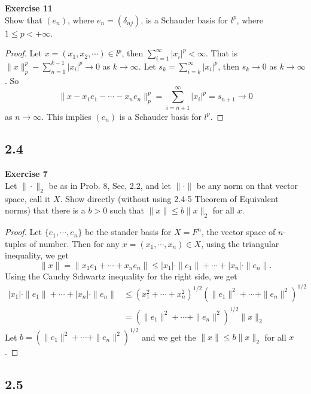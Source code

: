 \documentclass[12pt, a4paper]{article}
\theoremstyle{plain}
\newenvironment{exercise}[2][Exercise]
    { \begin{mdframed}[backgroundcolor=gray!20] \textbf{#1 #2} \\}
    {  \end{mdframed}}
\begin{document}
\begin{exercise}{11}
Show that $(e_n)$, where $e_n=(\delta_{nj})$, is a Schauder basis for $l^p$, where $1\leq p<+\infty$.
\end{exercise}
	\begin{proof}
	Let $x=(x_1,x_2,\cdots)\in l^p$, then $\sum_{i=1}^{\infty}{|x_i|^p}<\infty$. That is $\|x\|_p^p-\sum_{n=1}^{k-1}{|x_i|^p}\rightarrow 0$ as $k\rightarrow\infty$. Let $s_k = \sum_{i=k}^{\infty}{|x_i|^p}$, then $s_k\rightarrow 0$ as $k\rightarrow \infty$. So
	\[
	\|x-x_1e_1-\cdots-x_ne_n\|_p^p = \sum_{i=n+1}^{\infty}{|x_i|^p} = s_{n+1} \rightarrow 0
	\]
	as $n\rightarrow \infty$. This implies $(e_n)$ is a Schauder basis for $l^p$.
	\end{proof}
	
\pagebreak
\subsection*{2.4}
\begin{exercise}{7}
Let $\|\cdot\|_2$ be as in Prob. 8, Sec, 2.2, and let $\|\cdot\|$ be any norm on that vector space, call it $X$. Show directly (without using 2.4-5 Theorem of Equivalent norms) that there is a $b>0$ such that $\|x\|\leq b\|x\|_2$ for all $x$.
\end{exercise}
	\begin{proof}
	Let $\{e_1,\cdots,e_n\}$ be the stander basis for $X = F^n$, the vector space of $n$-tuples of number. Then for any $x=(x_1,\cdots,x_n)\in X$, using the triangular inequality, we get
	\[
	\|x\|=\|x_1e_1+\cdots+x_ne_n\|\leq |x_1|\cdot\|e_1\|+\cdots +|x_n|\cdot\|e_n\|.
	\]
	Using the Cauchy Schwartz inequality for the right side, we get
	\begin{align*}
	|x_1|\cdot\|e_1\|+\cdots +|x_n|\cdot\|e_n\|&\leq (x_1^2+\cdots+x_n^2)^{1/2}(\|e_1\|^2+\cdots+\|e_n\|^2)^{1/2}\\
	&=(\|e_1\|^2+\cdots+\|e_n\|^2)^{1/2}\|x\|_2
	\end{align*}
	Let $b=(\|e_1\|^2+\cdots+\|e_n\|^2)^{1/2}$ and we get the $\|x\|\leq b\|x\|_2$ for all $x$.
	\end{proof}

\subsection*{2.5}
\end{document}
